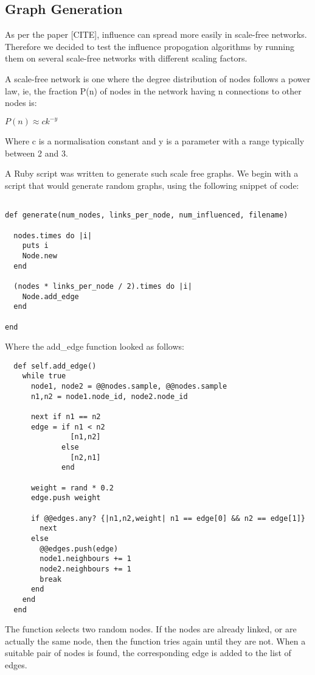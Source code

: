 \subsection{Graph Generation}

As per the paper [CITE], influence can spread more easily in scale-free networks. Therefore we decided to test the influence propogation algorithms by running them on several scale-free networks with different scaling factors.

A scale-free network is one where the degree distribution of nodes follows a power law, ie, the fraction P(n) of nodes in the network having n connections to other nodes is:

\(P(n) \approx ck^{-y}\)

Where c is a normalisation constant and y is a parameter with a range typically between 2 and 3.

A Ruby script was written to generate such scale free graphs. We begin with a script that would generate random graphs, using the following snippet of code:

\begin{verbatim}

def generate(num_nodes, links_per_node, num_influenced, filename)

  nodes.times do |i|
    puts i
    Node.new
  end

  (nodes * links_per_node / 2).times do |i|
    Node.add_edge
  end

end
\end{verbatim}

Where the add\_edge function looked as follows:

\begin{verbatim}
  def self.add_edge()
    while true
      node1, node2 = @@nodes.sample, @@nodes.sample
      n1,n2 = node1.node_id, node2.node_id

      next if n1 == n2
      edge = if n1 < n2
               [n1,n2]
             else
               [n2,n1]
             end

      weight = rand * 0.2
      edge.push weight

      if @@edges.any? {|n1,n2,weight| n1 == edge[0] && n2 == edge[1]}
        next
      else
        @@edges.push(edge)
        node1.neighbours += 1
        node2.neighbours += 1
        break
      end
    end
  end

\end{verbatim}

The function selects two random nodes. If the nodes are already linked, or are actually the same node, then the function tries again until they are not. When a suitable pair of nodes is found, the corresponding edge is added to the list of edges.

